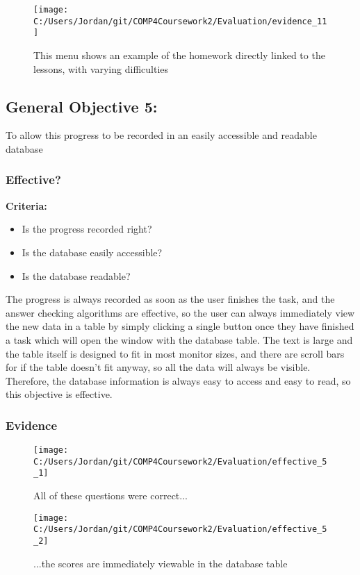 \begin{figure}[H]
	\texttt{[image: C:/Users/Jordan/git/COMP4Coursework2/Evaluation/evidence\_11]}
	\caption{This menu shows an example of the homework directly linked to the lessons, with varying difficulties}
\end{figure}

\subsection{General Objective 5: }

To allow this progress to be recorded in an easily accessible and readable database

\subsubsection{Effective?}

\textbf{Criteria: }

\begin{itemize}
	\item Is the progress recorded right?
	\item Is the database easily accessible?
	\item Is the database readable?
\end{itemize}

The progress is always recorded as soon as the user finishes the task, and the answer checking algorithms are effective, so the user can always immediately view the new data in a table by simply clicking a single button once they have finished a task which will open the window with the database table. The text is large and the table itself is designed to fit in most monitor sizes, and there are scroll bars for if the table doesn't fit anyway, so all the data will always be visible. Therefore, the database information is always easy to access and easy to read, so this objective is effective.

\subsubsection{Evidence}

\begin{figure}[H]
	\texttt{[image: C:/Users/Jordan/git/COMP4Coursework2/Evaluation/effective\_5\_1]}
	\caption{All of these questions were correct...}
\end{figure}

\begin{figure}[H]
	\texttt{[image: C:/Users/Jordan/git/COMP4Coursework2/Evaluation/effective\_5\_2]}
	\caption{...the scores are immediately viewable in the database table}
\end{figure}

